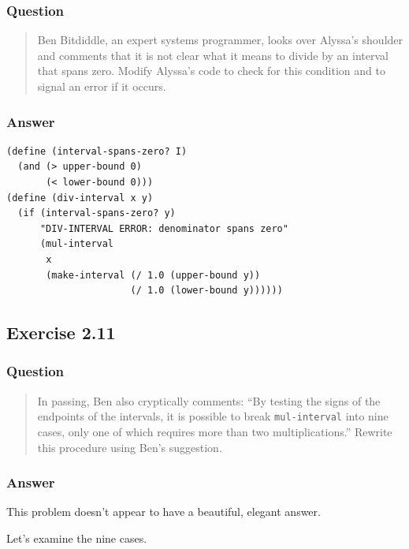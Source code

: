 \documentclass[final,fleqn,titlepage,twoside]{article}
\begin{document}
\subsubsection{Question}
\label{sec:org1021d56}
\begin{quote}
Ben Bitdiddle, an expert systems programmer, looks over Alyssa's shoulder and
comments that it is not clear what it means to divide by an interval that spans
zero. Modify Alyssa's code to check for this condition and to signal an error if
it occurs.
\end{quote}

\subsubsection{Answer}
\label{sec:org8489d7e}
\begin{verbatim}
(define (interval-spans-zero? I)
  (and (> upper-bound 0)
       (< lower-bound 0)))
(define (div-interval x y)
  (if (interval-spans-zero? y)
      "DIV-INTERVAL ERROR: denominator spans zero"
      (mul-interval
       x
       (make-interval (/ 1.0 (upper-bound y))
                      (/ 1.0 (lower-bound y))))))
\end{verbatim}

\subsection{Exercise 2.11}
\label{sec:org8efd39c}
\subsubsection{Question}
\label{sec:org892c8cc}
\begin{quote}
In passing, Ben also cryptically comments: ``By testing the signs of the
endpoints of the intervals, it is possible to break \texttt{mul-interval}
into nine cases, only one of which requires more than two multiplications.''
Rewrite this procedure using Ben's suggestion.
\end{quote}

\subsubsection{Answer}
\label{sec:org2343e3a}
This problem doesn't appear to have a beautiful, elegant answer.

Let's examine the nine cases.
\end{document}
